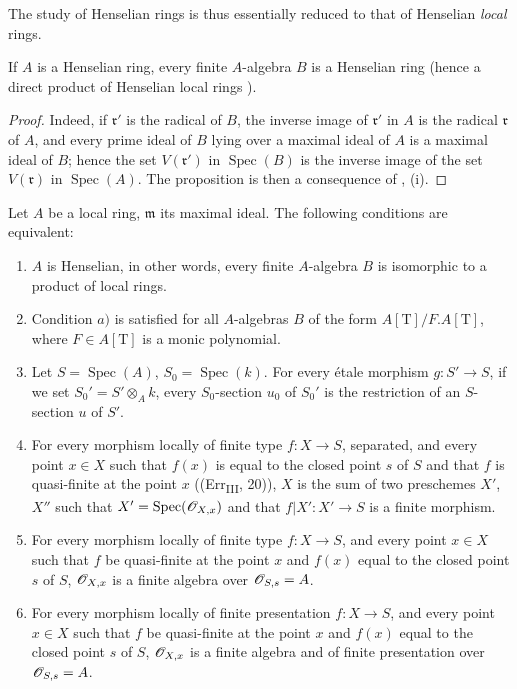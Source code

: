 The study of Henselian rings is thus essentially reduced to that of Henselian \emph{local} rings.

\begin{proposition}[18.5.10]
\label{IV.18.5.10}
If $A$ is a Henselian ring, every finite $A$-algebra $B$ is a Henselian ring (hence a direct product of Henselian local rings ).
\end{proposition}

\begin{proof}
Indeed, if $\mathfrak{r}'$ is the radical of $B$, the inverse image of $\mathfrak{r}'$ in $A$ is the radical $\mathfrak{r}$ of $A$, and every prime ideal of $B$ lying over a maximal ideal of $A$ is a maximal ideal of $B$;
hence the set $V(\mathfrak{r}')$ in $\operatorname{Spec}(B)$ is the inverse image of the set $V(\mathfrak{r})$ in $\operatorname{Spec}(A)$.
The proposition is then a consequence of , (i).
\end{proof}

\begin{theorem}[18.5.11]
\label{IV.18.5.11}
Let $A$ be a local ring, $\mathfrak{m}$ its maximal ideal.
The following conditions are equivalent:
\begin{enumerate}[label=\emph{\alph*)}]
  \item $A$ is Henselian, in other words, every finite $A$-algebra $B$ is isomorphic to a product of local rings.
  \item[a$'$)] Condition $a)$ is satisfied for all $A$-algebras $B$ of the form $A[\mathrm{T}]/F.A[\mathrm{T}]$, where $F\in A[\mathrm{T}]$ is a monic polynomial.
  \item Let $S=\operatorname{Spec}(A)$, $S_0=\operatorname{Spec}(k)$.
For every \'etale morphism $g:S'\to S$, if we set $S_0'=S'\otimes_A k$, every $S_0$-section $u_0$ of $S_0'$ is the restriction of an $S$-section $u$ of $S'$.
  \item For every morphism locally of finite type $f:X\to S$, separated, and every point $x\in X$ such that $f(x)$ is equal to the closed point $s$ of $S$ and that $f$ is quasi-finite at the point $x$ ((Err\textsubscript{III}, 20)), $X$ is the sum of two preschemes $X'$, $X''$ such that $X'=\operatorname{Spec}(\mathscr{O}_{X,x})$ and that $f|X':X'\to S$ is a finite morphism.
  \item[c$'$)] For every morphism locally of finite type $f:X\to S$, and every point $x\in X$ such that $f$ be quasi-finite at the point $x$ and $f(x)$ equal to the closed point $s$ of $S$, $\mathscr{O}_{X,x}$ is a finite algebra over $\mathscr{O}_{S,s}=A$.
  \item[c$''$)] For every morphism locally of finite presentation $f:X\to S$, and every point $x\in X$ such that $f$ be quasi-finite at the point $x$ and $f(x)$ equal to the closed point $s$ of $S$, $\mathscr{O}_{X,x}$ is a finite algebra and of finite presentation over $\mathscr{O}_{S,s}=A$.
\end{enumerate}
\end{theorem}

